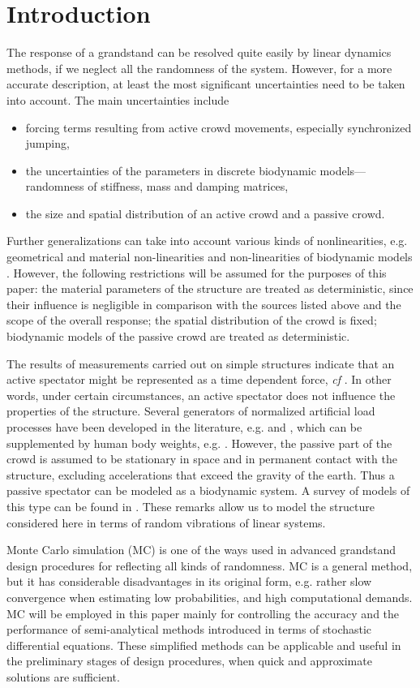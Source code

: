\documentclass[preprint,12pt,authoryear]{elsarticle}
\begin{document}
\section{Introduction}
\label{sectintroduction}
The response of a grandstand can be resolved quite easily by linear dynamics methods, if we neglect all the randomness of the system. However, for a more accurate description, at least the most significant uncertainties need to be taken into account. The main uncertainties include
\begin{itemize}
	\item forcing terms resulting from active crowd movements, especially synchronized jumping,
	\item the uncertainties of the parameters in discrete biodynamic models---randomness of stiffness, mass and damping matrices,
	\item the size and spatial distribution of an active crowd and a passive crowd.
\end{itemize}
Further generalizations can take into account various kinds of nonlinearities, e.g. geometrical and material non-linearities and non-linearities of biodynamic models \citep{Huang}. However, the following restrictions will be assumed for the purposes of this paper: the material parameters of the structure are treated as deterministic, since their influence is negligible in comparison with the sources listed above and the scope of the overall response; the spatial distribution of the crowd is fixed; biodynamic models of the passive crowd are treated as deterministic.

The results of measurements carried out on simple structures indicate that an active spectator might be represented as a time dependent force, \textit{cf} \citep{Ellis}. In other words, under certain circumstances, an active spectator does not influence the properties of the structure. Several generators of normalized artificial load processes have been developed in the literature, e.g. \citep{Sim} and \citep{Racic}, which can be supplemented by human body weights, e.g. \citep{Hermanussen}. However, the passive part of the crowd is assumed to be stationary in space and in permanent contact with the structure, excluding accelerations that exceed the gravity of the earth. Thus a passive spectator can be modeled as a biodynamic system. A survey of models of this type can be found in \citep{Sachse}. These remarks allow us to model the structure considered here in terms of random vibrations of linear systems.

Monte Carlo simulation (MC) is one of the ways used in advanced grandstand design procedures for reflecting all kinds of randomness. MC is a general method, but it has considerable disadvantages in its original form, e.g. rather slow convergence when estimating low probabilities, and high computational demands. MC will be employed in this paper mainly for controlling the accuracy and the performance of semi-analytical methods introduced in terms of stochastic differential equations. These simplified methods can be applicable and useful in the preliminary stages of design procedures, when quick and approximate solutions are sufficient.
\end{document}
